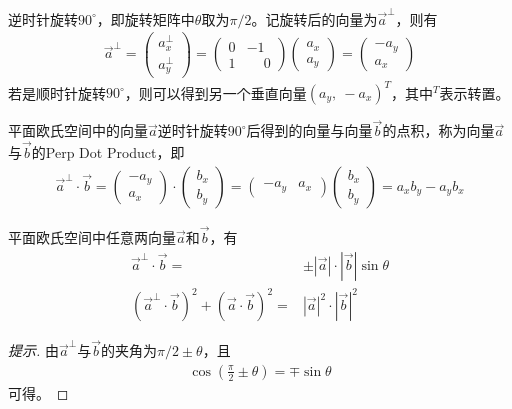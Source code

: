 \begin{example}[垂直向量]
  逆时针旋转$90^\circ$，即旋转矩阵中$\theta$取为$\pi/2$。记旋转后的向量为$\vec a^\perp$，则有
  \begin{align*}
    \vec a^\perp = 
    \begin{pmatrix}
      a_x^\perp\\ a_y^\perp
    \end{pmatrix}=
    \begin{pmatrix}
      0 & -1\\
      1 & \phantom{-}0
    \end{pmatrix}
    \begin{pmatrix}
      a_x\\ a_y
    \end{pmatrix}=
    \begin{pmatrix}
      -a_y\\ a_x
    \end{pmatrix}
  \end{align*}
  若是顺时针旋转$90^\circ$，则可以得到另一个垂直向量$(a_y,\ -a_x)^T$，其中$^T$表示转置。
\end{example}

\begin{definition}
  平面欧氏空间中的向量$\vec a$逆时针旋转$90^\circ$后得到的向量与向量$\vec b$的点积，称为向量$\vec a$与$\vec b$的Perp Dot Product，即
  \begin{align*}
    \vec a^\perp \cdot \vec b =
    \begin{pmatrix}
      -a_y\\ a_x
    \end{pmatrix} \cdot
    \begin{pmatrix}
      b_x\\ b_y
    \end{pmatrix} =
    \begin{pmatrix}
      -a_y & a_x
    \end{pmatrix}
    \begin{pmatrix}
      b_x\\ b_y
    \end{pmatrix} =
    a_xb_y - a_yb_x
  \end{align*}
\end{definition}

\begin{theorem}
  平面欧氏空间中任意两向量$\vec a$和$\vec b$，有
  \begin{align*}
    \vec a^\perp\cdot \vec b={}&\pm \left|\vec a\right|\cdot\left|\vec b\right|\sin\theta\\
    \left(\vec a^\perp\cdot \vec b\right)^2 + \left(\vec a\cdot\vec b\right)^2 ={}& \left|\vec a\right|^2 \cdot \left|\vec b\right|^2
  \end{align*}
\end{theorem}
\begin{proof}[提示]
  由$\vec a^\perp$与$\vec b$的夹角为$\pi/2 \pm \theta$，且
  \begin{align*}
    \cos\left(\frac\pi2\pm\theta\right)=\mp\sin\theta
  \end{align*}
  可得。
\end{proof}


